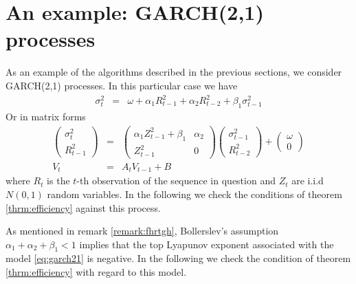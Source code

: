 
\section{An example: GARCH(2,1) processes}
As an example of the algorithms described in the previous sections, we
consider GARCH(2,1) processes. In this particular case we have
\begin{eqnarray*}
  \sigma_t^2 &=& \omega + \alpha_1 R_{t-1}^2 + \alpha_2 R_{t-2}^2 +
  \beta_1 \sigma_{t-1}^2
\end{eqnarray*}
Or in matrix forms
\begin{eqnarray}
  \begin{pmatrix}
    \sigma_t^2 \\
    R_{t-1}^2
  \end{pmatrix}
  &=&
  \begin{pmatrix}
  \alpha_1 Z_{t-1}^2 + \beta_1 & \alpha_2 \\
  Z_{t-1}^2 & 0
  \end{pmatrix}
  \begin{pmatrix}
    \sigma_{t-1}^2 \\
    R_{t-2}^2
  \end{pmatrix}
  +
  \begin{pmatrix}
    \omega \\
    0
  \end{pmatrix}
  \label{eq:garch21} \\
  V_t &=& A_t V_{t-1} + B \nonumber
\end{eqnarray}
where $R_t$ is the $t$-th observation of the sequence in question and
$Z_t$ are i.i.d $N(0,1)$ random variables. In the following we check
the conditions of theorem \ref{thrm:efficiency} against this process. 

As mentioned in remark \ref{remark:fhrtgh}, Bollerslev's assumption
$\alpha_1 + \alpha_2 + \beta_1 < 1$ implies that the top Lyapunov
exponent associated with the model \eqref{eq:garch21} is
negative. In the following we check the condition of theorem
\ref{thrm:efficiency} with regard to this model.

